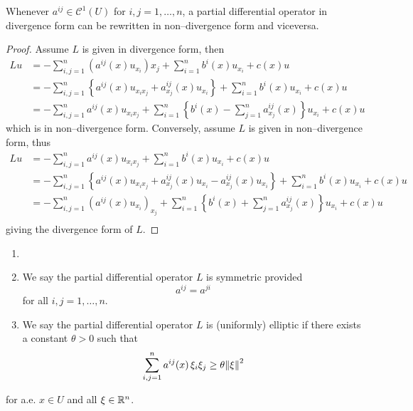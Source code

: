 \begin{prop}
	Whenever $a^{ij} \in \mathcal{C}^1(U)$ for $i, j = 1, \ldots, n$, a partial
	differential operator in divergence form can be rewritten in non--divergence
	form and viceversa.
\end{prop}
\begin{proof}
	Assume $L$ is given in divergence form, then
	\begin{align*}
		L u &= -\sum_{i,j=1}^n (a^{ij}(x) u_{x_i})x_j + \sum_{i=1}^n b^i(x) u_{x_i} + c(x) u \\
		&=
		-\sum_{i,j=1}^n \left\{ a^{ij}(x) u_{x_i x_j} + a_{x_j}^{ij}(x) u_{x_i} \right\} + \sum_{i=1}^n b^i(x) u_{x_i} + c(x) u \\
		&= 
		-\sum_{i,j=1}^na^{ij}(x) u_{x_i x_j} + \sum_{i=1}^n \left\{ b^i(x) - \sum_{j=1}^n a_{x_j}^{ij}(x) \right\} u_{x_i} + c(x) u
	\end{align*}
	which is in non--divergence form. Conversely, assume $L$ is given in non--divergence form, thus
	\begin{align*}		
		L u &= - \sum_{i,j=1}^n a^{ij}(x) u_{x_i x_j} + \sum_{i=1}^n b^i(x) u_{x_i} + c(x) u \\
		&=
		- \sum_{i,j=1}^n \left\{ a^{ij}(x) u_{x_i x_j} + a_{x_j}^{ij}(x) u_{x_i} - a_{x_j}^{ij}(x) u_{x_i} \right\}
		+ \sum_{i=1}^n b^i(x) u_{x_i} + c(x) u \\
		&=
		- \sum_{i,j=1}^n (a^{ij}(x) u_{x_i})_{x_j} + \sum_{i=1}^n \left\{ b^i(x) + \sum_{j=1}^n a_{x_j}^{ij}(x) \right\} u_{x_i} + c(x) u \\
	\end{align*}
	giving the divergence form of $L$.
\end{proof}

\begin{definition}
	\begin{enumerate}[label={(\roman*)}, topsep=0pt]
		\item[]
		\item We say the partial differential operator $L$ is symmetric provided 
		\begin{equation} \label{eq:operator_L_symmetry}
			a^{ij} = a^{ji}
		\end{equation}
		for all $i, j = 1, \ldots, n$.
		\item We say the partial differential operator $L$ is (uniformly)
		elliptic if there exists a constant $\theta > 0$ such that
		\begin{equation} \label{eq:operator_L_uniformly_elliptic}
			\sum_{i,j=1}^n a^{ij}(x) \, \xi_i \xi_j \geq \theta \norm{\xi}^2
		\end{equation}
	\end{enumerate}
	for a.e. $x \in U$ and all $\xi \in \mathbb{R}^n$.
\end{definition}

